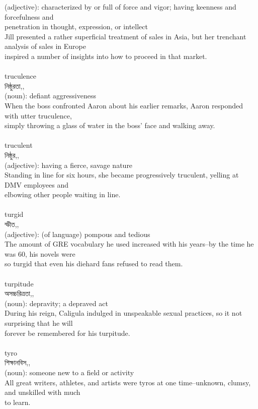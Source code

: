 \documentclass{article}
\begin{document}
{{(adjective): characterized by or full of force and vigor; having keenness and forcefulness and\\penetration in thought, expression, or intellect\\Jill presented a rather superficial treatment of sales in Asia, but her trenchant analysis of sales in Europe\\inspired a number of insights into how to proceed in that market.\\}\\
{truculence}\\
{নিষ্ঠুরতা,,}\\
{(noun): defiant aggressiveness\\When the boss confronted Aaron about his earlier remarks, Aaron responded with utter truculence,\\simply throwing a glass of water in the boss' face and walking away.\\}\\
{truculent}\\
{নিষ্ঠুর,,}\\
{(adjective): having a fierce, savage nature\\Standing in line for six hours, she became progressively truculent, yelling at DMV employees and\\elbowing other people waiting in line.\\}\\
{turgid}\\
{স্ফীত,,}\\
{(adjective): (of language) pompous and tedious\\The amount of GRE vocabulary he used increased with his years--by the time he was 60, his novels were\\so turgid that even his diehard fans refused to read them.\\}\\
{turpitude}\\
{অসচ্চরিত্রতা,,}\\
{(noun): depravity; a depraved act\\During his reign, Caligula indulged in unspeakable sexual practices, so it not surprising that he will\\forever be remembered for his turpitude.\\}\\
{tyro}\\
{শিক্ষানবিস,,}\\
{(noun): someone new to a field or activity\\All great writers, athletes, and artists were tyros at one time--unknown, clumsy, and unskilled with much\\to learn.\\}\\
}
\end{document}
